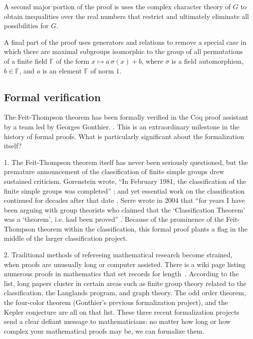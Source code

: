 \documentclass[brochure,english,12pt]{bourbaki}
\theoremstyle{plain}
\def\ring#1{{\mathbb{#1}}}
\begin{document}

A second major portion of the proof is uses the complex character theory of $G$ to obtain inequalities over the real numbers
that restrict and ultimately eliminate all possibilities for $G$. 

A final part of the proof uses generators and relations to remove a special case in which there
are maximal subgroups isomorphic to the group of all permutations of a finite field $\ring{F}$
of the form $x \mapsto a\, \sigma (x) + b$, where $\sigma$ is a field automorphism, $b\in\ring{F}$,
and $a$ is an element $\ring{F}$ of norm $1$.





\subsection{Formal verification}


The Feit-Thompson theorem has been formally verified in the Coq proof assistant by a team led by Georges Gonthier.
\cite{gonthier2013machine}.  This is an extraordinary milestone in the history of formal proofs.
What is particularly significant about the formalization itself?

1. The Feit-Thompson theorem itself has never been seriously questioned,
but the premature announcement of the classification of finite simple groups drew sustained criticism.
 Gorenstein wrote, ``In February 1981, the classification of the finite simple groups was
completed'' \cite[page 1]{gorenstein2007finite}; and yet essential work on the classification
continued for decades after that date \cite{aschbacher2004status}. 
Serre wrote in 2004 that ``for years I have been arguing with group theorists who claimed
that the `Classification Theorem' was a `theorem', i.e. had been proved'' \cite{raussen2004interview}.
Because of the prominence of the Feit-Thompson theorem within the classification, 
this formal proof plants a flag in the middle of the larger classification project.



2. Traditional methods of refereeing mathematical research become strained, when
proofs are unusually long or computer assisted.  There is a wiki page listing numerous proofs
in mathematics that set records for length~\cite{WikiLong}.
According to the list,
long papers cluster in certain areas
such as finite group theory related to the classification, 
the Langlands program,
and graph theory.  The odd order theorem, the four-color theorem (Gonthier's previous formalization
project), and the Kepler conjecture are all on that list. 
These three recent formalization projects send a clear defiant message  to mathematicians:
no matter how long or how complex your mathematical proofs may be, we can formalize them.
\end{document}
